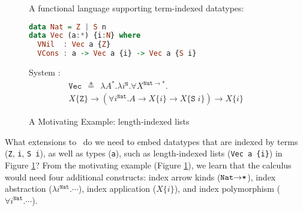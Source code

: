 \begin{figure}\noindent
{}
\!\!\!\!\!A functional language supporting term-indexed datatypes: \vspace*{-4.5pt}
\begin{lstlisting}[basicstyle={\ttfamily},language=Haskell]
data Nat = Z | S n
data Vec (a:*) {i:N} where
  VNil  : Vec a {Z}
  VCons : a -> Vec a {i} -> Vec a {S i}
\end{lstlisting}\noindent
\!\!\!System \Fi: \vspace*{-7pt}
\begin{multline*}\!\!\!\!\!\!\!
\texttt{{Vec}}\:\:\triangleq\:\:\lambda A^{*}.\lambda i^{\texttt{{N}}}.
\forall X^{\texttt{{Nat}}\to*}.\\
X\{\texttt{{Z}}\}\to
(\forall i^{\texttt{{Nat}}}.A\to X\{i\}\to X\{\texttt{{S}}\; i\})\to X\{i\}
\end{multline*}\vspace*{-10pt}
\caption{A Motivating Example: length-indexed lists}
\label{fig:motiv}
\end{figure}

What extensions to \Fw\ do we need to embed datatypes that are indexed by
terms (\texttt{Z}, \texttt{i}, \texttt{S i}), as well as types (\texttt{a}),
such as length-indexed lists (\verb|Vec a {i}|) in Figure \ref{fig:motiv}?
From the motivating example (Figure \ref{fig:motiv}), we learn that
the calculus would need four additional constructs:
index arrow kinds ($\texttt{{Nat}\ensuremath{\to}*}$),
index abstraction ($\lambda i^{\texttt{{Nat}}}.\cdots$),
index application ($X\{i\}$), and
index polymorphism ($\forall i^{\texttt{{Nat}}}.\cdots$).


